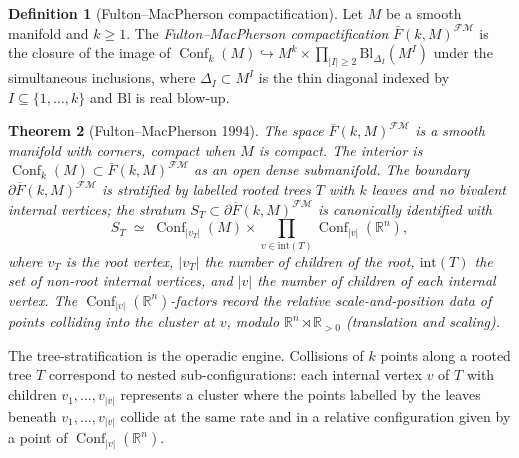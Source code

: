\documentclass[11pt]{article}
\newtheorem{theorem}{Theorem}[section]
\theoremstyle{definition}
\newtheorem{definition}[theorem]{Definition}
\theoremstyle{remark}
\DeclareMathOperator{\Conf}{Conf}
\newcommand{\FMbar}{\overline{F}}
\newcommand{\FM}{\mathcal{FM}}
\begin{document}
\begin{definition}[Fulton--MacPherson compactification]
\label{def:fm-compactification}
Let $M$ be a smooth manifold and $k \geq 1$. The
\emph{Fulton--MacPherson compactification}
$\FMbar(k, M)^{\FM}$ \cite{FultonMacPherson1994} is the closure of
the image of $\Conf_k(M) \hookrightarrow M^k \times
\prod_{|I| \geq 2} \mathrm{Bl}_{\Delta_I}(M^I)$ under the simultaneous
inclusions, where $\Delta_I \subset M^I$ is the thin diagonal indexed
by $I \subseteq \{1, \ldots, k\}$ and $\mathrm{Bl}$ is real blow-up.
\end{definition}

\begin{theorem}[Fulton--MacPherson 1994]
\label{thm:fm-basic}
The space $\FMbar(k, M)^{\FM}$ is a smooth manifold with corners,
compact when $M$ is compact. The interior is
$\Conf_k(M) \subset \FMbar(k, M)^{\FM}$ as an open dense submanifold.
The boundary $\partial \FMbar(k, M)^{\FM}$ is stratified by labelled
rooted trees $T$ with $k$ leaves and no bivalent internal vertices;
the stratum $S_T \subset \partial \FMbar(k, M)^{\FM}$ is canonically
identified with
\[
 S_T \;\simeq\; \Conf_{|v_T|}(M) \times
 \prod_{v \in \mathrm{int}(T)} \Conf_{|v|}(\mathbb{R}^n),
\]
where $v_T$ is the root vertex, $|v_T|$ the number of children of
the root, $\mathrm{int}(T)$ the set of non-root internal vertices,
and $|v|$ the number of children of each internal vertex. The
$\Conf_{|v|}(\mathbb{R}^n)$-factors record the \emph{relative}
scale-and-position data of points colliding into the cluster at
$v$, modulo $\mathbb{R}^n \rtimes \mathbb{R}_{>0}$ (translation and
scaling).
\end{theorem}

The tree-stratification is the operadic engine. Collisions of $k$
points along a rooted tree $T$ correspond to nested sub-configurations:
each internal vertex $v$ of $T$ with children $v_1, \ldots, v_{|v|}$
represents a cluster where the points labelled by the leaves beneath
$v_1, \ldots, v_{|v|}$ collide at the same rate and in a relative
configuration given by a point of $\Conf_{|v|}(\mathbb{R}^n)$.
\end{document}
